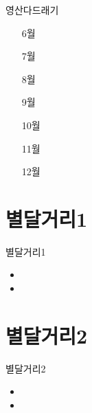 \documentclass[aspectratio=1610,17pt,xcolor=pdftex,dvipsnames,table,handout]{beamer}
\begin{document}
		\begin{frame} [t,plain]
			\begin{block} { 영산다드래기 }

			\setlength{\leftmargini}{5em}			
			\begin{itemize}
				\item [6월] 
				\item [7월] 
				\item [8월] 
				\item [9월] 
				\item [10월] 
				\item [11월] 
				\item [12월] 
			\end{itemize}
			\end{block}
		\end{frame}

		\section{ 별달거리1 }

		\begin{frame} [t,plain]
			\begin{block} { 별달거리1 }
			\begin{itemize}
				\item 
				\item 
			\end{itemize}
			\end{block}
		\end{frame}


		\section{ 별달거리2 }

		\begin{frame} [t,plain]
			\begin{block} { 별달거리2 }
			\begin{itemize}
				\item 
				\item 
			\end{itemize}
			\end{block}
		\end{frame}
\end{document}

